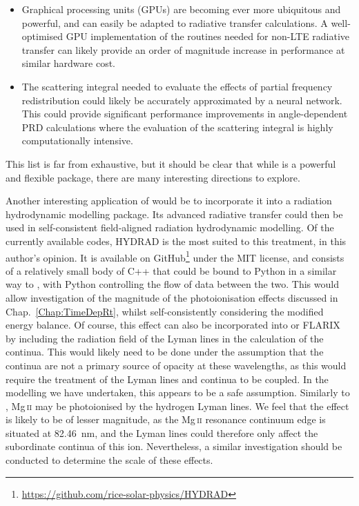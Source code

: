 \begin{itemize}
	\item Graphical processing units (GPUs) are becoming ever more ubiquitous and powerful, and can easily be adapted to radiative transfer calculations. A well-optimised GPU implementation of the routines needed for non-LTE radiative transfer can likely provide an order of magnitude increase in performance at similar hardware cost.
	\item The scattering integral needed to evaluate the effects of partial frequency redistribution could likely be accurately approximated by a neural network. This could provide significant performance improvements in angle-dependent PRD calculations where the evaluation of the scattering integral is highly computationally intensive.
\end{itemize}
This list is far from exhaustive, but it should be clear that while \Lw{} is a powerful and flexible package, there are many interesting directions to explore.

Another interesting application of \Lw{} would be to incorporate it into a radiation hydrodynamic modelling package.
Its advanced radiative transfer could then be used in self-consistent field-aligned radiation hydrodynamic modelling.
Of the currently available codes, HYDRAD is the most suited to this treatment, in this author's opinion.
It is available on GitHub\footnote{\url{https://github.com/rice-solar-physics/HYDRAD}} under the MIT license, and consists of a relatively small body of C++ that could be bound to Python in a similar way to \Lw{}, with Python controlling the flow of data between the two.
This would allow investigation of the magnitude of the \Caii{} photoionisation effects discussed in Chap.~\ref{Chap:TimeDepRt}, whilst self-consistently considering the modified energy balance.
Of course, this effect can also be incorporated into \Radyn{} or FLARIX by including the radiation field of the Lyman lines in the calculation of the \Caii{} continua.
This would likely need to be done under the assumption that the \Caii{} continua are not a primary source of opacity at these wavelengths, as this would require the treatment of the Lyman lines and \Caii{} continua to be coupled.
In the modelling we have undertaken, this appears to be a safe assumption.
Similarly to \Caii{}, Mg\,\textsc{ii} may be photoionised by the hydrogen Lyman lines.
We feel that the effect is likely to be of lesser magnitude, as the Mg\,\textsc{ii} resonance continuum edge is situated at \SI{82.46}{\nano\m}, and the Lyman lines could therefore only affect the subordinate continua of this ion.
Nevertheless, a similar investigation should be conducted to determine the scale of these effects.

